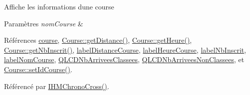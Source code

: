 Affiche les informations d\textquotesingle{}une course 
\begin{DoxyParams}{Paramètres}
{\em nom\+Course} & \\
\hline
\end{DoxyParams}


Références \hyperlink{class_i_h_m_chrono_cross_a03a8226c0e7f423d29302d9a06284ab4}{course}, \hyperlink{class_course_af20fcd6d6eb2dfbd3b0f12e273f12b27}{Course\+::get\+Distance()}, \hyperlink{class_course_afc21f8195edd50c9fd266cff0c401b7c}{Course\+::get\+Heure()}, \hyperlink{class_course_ad0ff4153f1e02826d551f478f95ad260}{Course\+::get\+Nb\+Inscrit()}, \hyperlink{class_i_h_m_chrono_cross_a4748740a4973bf62c408be380ac0ae77}{label\+Distance\+Course}, \hyperlink{class_i_h_m_chrono_cross_ad071b8c6ecc126fca3e17e58e83942d9}{label\+Heure\+Course}, \hyperlink{class_i_h_m_chrono_cross_a9d410e8bc161481a83298176b2702519}{label\+Nb\+Inscrit}, \hyperlink{class_i_h_m_chrono_cross_aebe86f4e614f568db5558bf99f1b44e6}{label\+Nom\+Course}, \hyperlink{class_i_h_m_chrono_cross_aeba189eacad7e19e009ae4764f98b9be}{Q\+L\+C\+D\+Nb\+Arrivees\+Classees}, \hyperlink{class_i_h_m_chrono_cross_a9cf1b999b13e69fdd0fb11ddb9011ed5}{Q\+L\+C\+D\+Nb\+Arrivees\+Non\+Classees}, et \hyperlink{class_course_a36cf16c971841431947b6fbe2b3f3d27}{Course\+::set\+Id\+Course()}.



Référencé par \hyperlink{class_i_h_m_chrono_cross_a479fc90733fba3e65fb06aa4a3adc02e}{I\+H\+M\+Chrono\+Cross()}.


